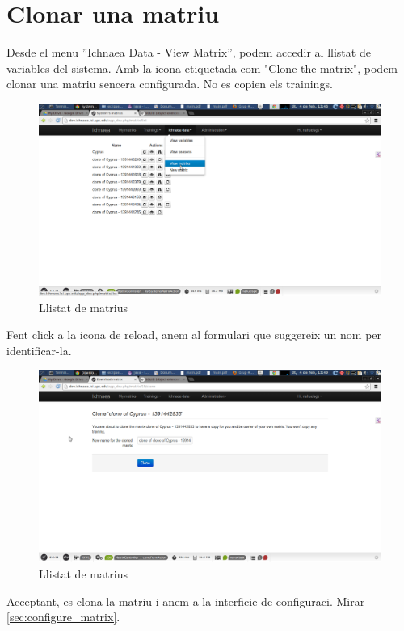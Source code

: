 \section{Clonar una matriu}
\label{sec:clone_matrix}
Desde el menu ''Ichnaea Data - View Matrix'', podem accedir al llistat de variables del sistema. Amb la icona etiquetada com "Clone the matrix", podem clonar una matriu sencera configurada. No es copien els trainings.
\begin{figure}[h!]
  \centering
  \includegraphics[scale=0.2]{img/userguide/clone_matrix.png}
  \caption{Llistat de matrius}
  \label{fig:placement}
\end{figure}
Fent click a la icona de reload, anem al formulari que suggereix un nom per identificar-la.
\begin{figure}[h!]
  \centering
  \includegraphics[scale=0.2]{img/userguide/clone_matrix-2.png}
  \caption{Llistat de matrius}
  \label{fig:placement}
\end{figure}
Acceptant, es clona la matriu i anem a la interficie de configuraci. Mirar \ref{sec:configure_matrix}.

